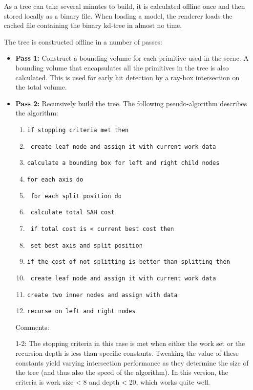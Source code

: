 As a tree can take several minutes to build, it is calculated offline once and then stored locally as a binary file. When loading a model, the renderer loads the cached file containing the binary kd-tree in almost no time.

The tree is constructed offline in a number of passes:
\begin{itemize}
  \item \textbf{Pass 1:} Construct a bounding volume for each primitive used in the scene. A bounding volume that encapsulates all the primitives in the tree is also calculated. This is used for early hit detection by a ray-box intersection on the total volume.
  \item \textbf{Pass 2:} Recursively build the tree. The following pseudo-algorithm describes the algorithm:


\begin{enumerate}
	\item \texttt{if stopping criteria met then }
	\item \texttt{  create leaf node and assign it with current work data}
	\item \texttt{calculate a bounding box for left and right child nodes}
	\item \texttt{for each axis do}
	\item \texttt{ for each split position do}
	\item \texttt{   calculate total SAH cost}
	\item \texttt{   if total cost is < current best cost then}
	\item \texttt{     set best axis and split position}
	\item \texttt{if the cost of not splitting is better than splitting then}
	\item \texttt{  create leaf node and assign it with current work data}
	\item \texttt{create two inner nodes and assign with data}
	\item \texttt{recurse on left and right nodes}
\end{enumerate}


  Comments: 

  1-2: The stopping criteria in this case is met when either the work set or the recursion depth is less than specific constants. Tweaking the value of these constants yield varying intersection performance as they determine the size of the tree (and thus also the speed of the algorithm). In this version, the criteria is work size < 8 and depth < 20, which works quite well. 


\end{itemize}
